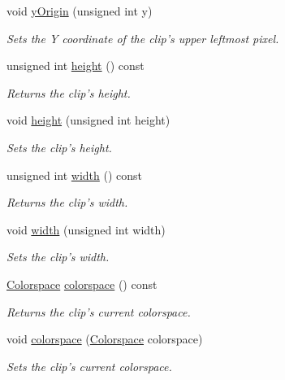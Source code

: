 \begin{CompactItemize}
void \hyperlink{class_clip_6b0100fdd089be816b97465df4dd2846}{yOrigin} (unsigned int y)
\begin{CompactList}\small\item\em Sets the Y coordinate of the clip's upper leftmost pixel. \item\end{CompactList}\item 
unsigned int \hyperlink{class_clip_393710a6b136f400dd5c900f8831e1a8}{height} () const 
\begin{CompactList}\small\item\em Returns the clip's height. \item\end{CompactList}\item 
void \hyperlink{class_clip_c6eeb473cb104e6e3f90f4099c7ef741}{height} (unsigned int height)
\begin{CompactList}\small\item\em Sets the clip's height. \item\end{CompactList}\item 
unsigned int \hyperlink{class_clip_d3e816599913e4051e5d50fae17ecd76}{width} () const 
\begin{CompactList}\small\item\em Returns the clip's width. \item\end{CompactList}\item 
void \hyperlink{class_clip_17c1a23e159bedb6e2988235b8b568e7}{width} (unsigned int width)
\begin{CompactList}\small\item\em Sets the clip's width. \item\end{CompactList}\item 
\hyperlink{_colorspace_8h_7a7e24cdb2a27271343f0adceff89f65}{Colorspace} \hyperlink{class_clip_e22de9122a399af67576eb114842846a}{colorspace} () const 
\begin{CompactList}\small\item\em Returns the clip's current colorspace. \item\end{CompactList}\item 
void \hyperlink{class_clip_7e7fa163b90c573adc424e022235c539}{colorspace} (\hyperlink{_colorspace_8h_7a7e24cdb2a27271343f0adceff89f65}{Colorspace} colorspace)
\begin{CompactList}\small\item\em Sets the clip's current colorspace. \item\end{CompactList}\item 

\end{CompactItemize}
